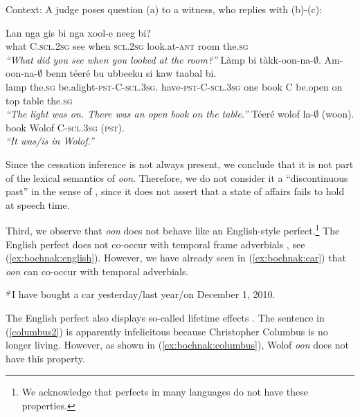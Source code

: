 \documentclass[output=paper]{langsci/langsci}
\begin{document}
  \begin{exe}
\ex\label{ex:bochnak:wolof1} Context: A judge poses question (a) to a witness, who replies with (b)-(c):
\begin{xlist}
\ex 
\gll Lan nga gis bi nga xool-e neeg bi?\\
what C.\textsc{scl.2sg} see when \textsc{scl.2sg} look.at-\textsc{ant} room the.\textsc{sg}\\
\glt\textit{``What did you see when you looked at the room?''}
\ex
\gll L\`amp bi t\`akk-oon-na-$\emptyset$. Am-oon-na-$\emptyset$ benn t\'eer\'e bu ubbeeku si kaw taabal bi.\\
lamp the.\textsc{sg}
be.alight-\textsc{pst}-C-\textsc{scl.3sg}. have-\textsc{pst}-C-\textsc{scl.3sg}
one book C be.open on top table the.\textsc{sg}\\
\glt\textit{``The light was on. There was an open book on the table.''}
\ex
\gll T\'eer\'e wolof la-$\emptyset$ (woon).\\
book Wolof C-\textsc{scl.3sg} (\textsc{pst}).\\
\glt \textit{``It was/is in Wolof.''}\label{ex:bochnak:wolof2}

\end{xlist}
\end{exe}



Since the cessation inference is not always present, we conclude that it is not part of the lexical semantics of \textit{oon}. Therefore, we do not consider it a ``discontinuous past'' in the sense of \citet{Plungian2006}, since it does not assert that a state of affairs fails to hold at speech time.


Third, we observe that \textit{oon} does not behave like an English-style perfect.\footnote{We acknowledge that perfects in many languages do not have these properties.} The English perfect does not co-occur with temporal frame adverbials \citep{klein92present}, see (\ref{ex:bochnak:english}). However, we have already seen in (\ref{ex:bochnak:car}) that \textit{oon} can co-occur with temporal adverbials.

\ea\label{ex:bochnak:english}
$^{\#}$I have bought a car yesterday/last year/on December 1, 2010.
\z

The English perfect also displays so-called lifetime effects \citep{mccawley71tense}. The sentence in (\ref{columbus2}) is apparently infelicitous because Christopher Columbus is no longer living. However, as shown in (\ref{ex:bochnak:columbus}), Wolof \textit{oon} does not have this property.
\end{document}
